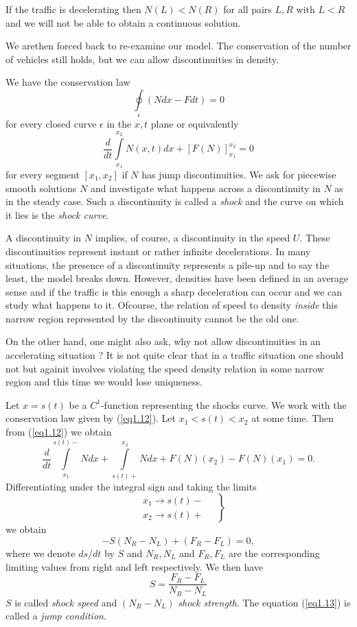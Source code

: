 If the traffic is decelerating then $N(L) < N(R)$ for all pairs $L,R$ with $L<R$ and we will not be able to obtain a continuous solution. 

We are\pageoriginale then forced back to re-examine our model. The conservation of the number of vehicles still holds, but we can allow discontinuities in density.

We have the conservation law 
$$
\oint\limits_\epsilon (N dx - Fdt) = 0
$$
for every closed curve $\epsilon$ in the $x,t$ plane or equivalently 
\begin{equation*}
\frac{d}{dt} \int\limits^{x_2}_{x_1} N(x,t) dx + [F(N)]^{x_2}_{x_1} =0 
\tag{1.12}\label{eq1.12}
\end{equation*}
for every segment $[x_1 , x_2]$ if $N$ has jump discontinuities. We ask for piecewise smooth solutions $N$ and investigate what happens across a discontinuity in $N$ as in the steady case. Such a discontinuity is called a {\em shock} and the curve on which it lies is the {\em shock curve}.

A discontinuity in $N$ implies, of course, a discontinuity in the speed $U$. These discontinuities represent instant or rather infinite decelerations. In many situations, the presence of a discontinuity represents a pile-up and to say the least, the model breaks  down. However, densities have been defined in an average sense and if the traffic is this enough a sharp deceleration can occur and we can study what happens to it. Ofcourse, the relation of speed to density {\em inside} this narrow region represented by the discontinuity cannot be the old one.

On the other hand, one might also ask, why not allow discontinuities in an accelerating situation ? It is not quite clear that in a traffic situation one should not but again\pageoriginale it involves violating the speed density relation in some narrow region and this time we would lose uniqueness. 

Let $x = s(t)$ be a $C^1$-function representing the shocks curve. We work with the conservation law given by (\ref{eq1.12}). Let $x_1 < s (t) < x_2$ at some time. Then from (\ref{eq1.12}) we obtain
$$
\frac{d}{dt} \int\limits^{s(t)-}_{x_1} Ndx + \int\limits^{x_2}_{s(t) +} Ndx + F(N) (x_2) - F(N) (x_1) = 0.
$$
Differentiating under the integral sign and taking the limits 
\begin{equation*}
\left.
\begin{aligned}
& x_1 \to s(t) - \quad \\
& x_2 \to s(t) + 
\end{aligned}
\right\} 
\end{equation*}
we obtain 
$$
-S (N_R - N_L) + (F_R - F_L) = 0,
$$
where we denote $ds/ dt$ by $S$ and $N_R, N_L$ and $F_R, F_L$ are the corresponding limiting values from right and left respectively. We then have
\begin{equation*}
S = \frac{F_R - F_L}{N_R - N_L}\tag{1.13}\label{eq1.13}
\end{equation*}
$S$ is called {\em shock speed } and $(N_R - N_L)$ {\em shock strength}. The equation (\ref{eq1.13}) is called a {\em jump condition}.

